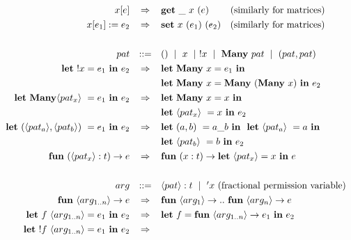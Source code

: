 \begin{center}
\[\def\arraystretch{1.3}
    \begin{array}{rcl}
    x[e] &
    \Rightarrow &
    \mathbf{get}\ \_\ x\ (e) \;\qquad \textrm{(similarly for matrices)}
\\
    x[e_1] := e_2 &
    \Rightarrow &
    \mathbf{set}\ x\ (e_1)\ (e_2) \quad \textrm{(similarly for matrices)}
\\
\\
    pat & ::= & ()\ \mid\ x\ \mid\ !x\ \mid\ \mathbf{Many\ } pat\ \mid\ (pat, pat)
\\
    \mathbf{let}\ !x = e_1\ \mathbf{in}\ e_2 &
    \Rightarrow &
    \specialcell[t]{l}{\mathbf{let\ Many}\ x = e_1\ \mathbf{in\ } \\
    \mathbf{let\ Many}\ x = \mathbf{Many}\ (\mathbf{Many}\ x)\ \mathbf{in}\ e_2}
\\
    \mathbf{let\ Many} \langle pat_x \rangle\ = e_1\ \mathbf{in}\ e_2 &
    \Rightarrow &
    \specialcell[t]{l}{%
        \mathbf{let\ Many}\ x = x\ \mathbf{in\ } \\
        \mathbf{let\ } \langle pat_x \rangle\ = x\ \mathbf{in\ } e_2}
\\
    \mathbf{let}\ (\langle pat_a \rangle, \langle pat_b \rangle)\  = e_1\ \mathbf{in}\ e_2 &
    \Rightarrow &
    \specialcell[t]{l}{%
        \mathbf{let\ } (a,b)\ = a\_b\ \mathbf{in\ }
        \ \mathbf{let\ } \langle pat_a \rangle\ = a\ \mathbf{in\ } \\
        \mathbf{let\ } \langle pat_b \rangle\ = b\ \mathbf{in\ } e_2}
\\
    \mathbf{fun}\ (\langle pat_x \rangle : t) \rightarrow e &
    \Rightarrow &
    \mathbf{fun}\ (x : t) \rightarrow \mathbf{let\ } \langle pat_x \rangle = x\ \mathbf{in\ } e
\\
\\
    arg & ::= & \langle pat \rangle : t\ \mid\ {'x} \textrm{ (fractional permission variable)}
\\
    \mathbf{fun}\ \langle arg_{1 .. n} \rangle \rightarrow e &
    \Rightarrow &
    \mathbf{fun}\ \langle arg_1 \rangle \rightarrow ..
    \ \mathbf{fun}\ \langle arg_n \rangle \rightarrow e
\\
    \mathbf{let}\ f\ {\langle arg_{1 .. n} \rangle} = e_1\ \mathbf{in}\ e_2 &
    \Rightarrow &
    \mathbf{let}\ f = \mathbf{fun}\ {\langle arg_{1 .. n} \rangle} \rightarrow e_1\
    \mathbf{in}\ e_2
\\
    \mathbf{let}\ !f\ {\langle arg_{1 .. n} \rangle} = e_1\ \mathbf{in}\ e_2 &
    \Rightarrow &

\end{array}\]
\end{center}
